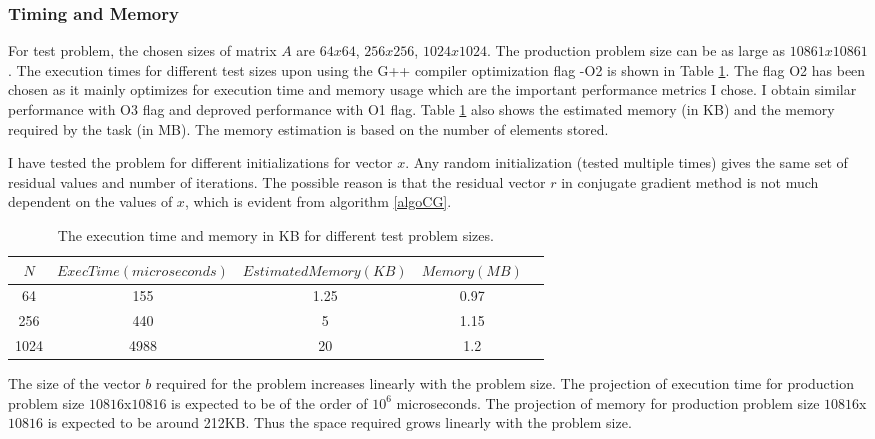 \documentclass{article}
\begin{document}
\begin{spacing}{1.1}
\subsubsection*{Timing and Memory}
For test problem, the chosen sizes of matrix $A$ are $64x64$, $256x256$, $1024x1024$. The production problem size can be as large as $10861x10861$. 
The execution times for different test sizes upon using the G++ compiler optimization flag -O2 is shown in Table \ref{exec_iter}. The flag O2 has been chosen as it mainly optimizes for execution time and memory usage which are the important performance metrics I chose. I obtain similar performance with O3 flag and deproved performance with O1 flag. Table \ref{exec_iter} also shows the estimated memory (in KB) and the memory required by the task (in MB). The memory estimation is based on the number of elements stored. 

I have tested the problem for different initializations for vector $x$. Any random initialization (tested multiple times) gives the same set of residual values and number of iterations. The possible reason is that the residual vector $r$ in conjugate gradient method is not much dependent on the values of $x$, which is evident from algorithm \eqref{algoCG}.

\begin{table}[H]
\begin{center}
 \begin{tabular}{| c | c|c|c|c|} 
 \hline
$N$ & $ExecTime (microseconds)$  & $Estimated Memory (KB)$ & $Memory (MB)$ \\ %
 \hline
64 & 155 &  1.25 & 0.97\\ %
256 &  440 & 5 & 1.15\\ %
1024 &  4988 & 20 & 1.2\\ %
 \hline
\end{tabular}%
\end{center}
\caption{\label{exec_iter} The execution time and memory in KB for different test problem sizes.  } 
\end{table}

The size of the vector $b$ required for the problem increases linearly with the problem size.
The projection of execution time for production problem size $10816$x$10816$ is expected to be of the order of $10^6$ microseconds. The projection of memory for production problem size $10816$x$10816$ is expected to be around 212KB. Thus the space required grows linearly with the problem size. 


\end{spacing}
\end{document}
